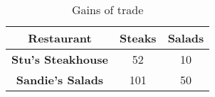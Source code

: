 \begin{table}[h]
  \centering
    \begin{tabular}{|c|c|c|}
      \hline
      \textbf{Restaurant} & \textbf{Steaks} & \textbf{Salads} \\
      \hline
      \textbf{Stu's Steakhouse} & 52 & 10 \\
      \hline
      \textbf{Sandie's Salads} & 101 & 50 \\
      \hline
    \end{tabular}
    \caption{Gains of trade}
  \end{table}